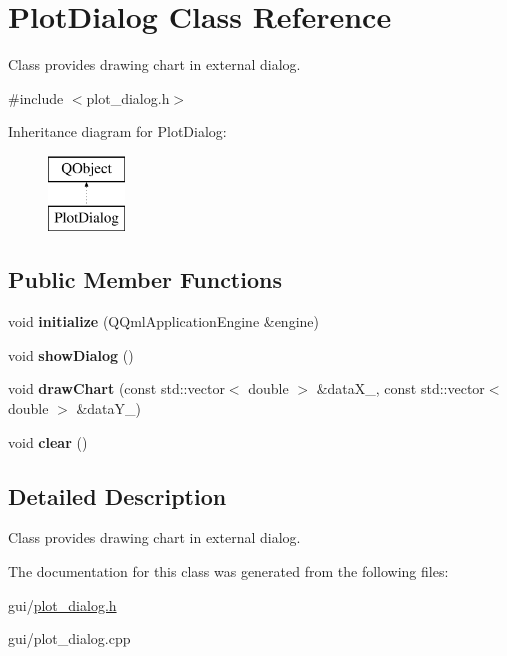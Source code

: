 \hypertarget{class_plot_dialog}{}\section{Plot\+Dialog Class Reference}
\label{class_plot_dialog}


Class provides drawing chart in external dialog.  




{\ttfamily \#include $<$plot\+\_\+dialog.\+h$>$}

Inheritance diagram for Plot\+Dialog\+:\begin{figure}[H]
\begin{center}
\leavevmode
\includegraphics[height=2.000000cm]{class_plot_dialog}
\end{center}
\end{figure}
\subsection*{Public Member Functions}
\begin{DoxyCompactItemize}
\item 
\mbox{\label{class_plot_dialog_ae5fb95c5336b5dd2267101dd181989a5}} 
void {\bfseries initialize} (Q\+Qml\+Application\+Engine \&engine)
\item 
\mbox{\label{class_plot_dialog_a7b5d5b476275028bf4186e737d50ebbe}} 
void {\bfseries show\+Dialog} ()
\item 
\mbox{\label{class_plot_dialog_a5bb43876e8c339604c4827d536a54726}} 
void {\bfseries draw\+Chart} (const std\+::vector$<$ double $>$ \&data\+X\+\_\+, const std\+::vector$<$ double $>$ \&data\+Y\+\_\+)
\item 
\mbox{\label{class_plot_dialog_aeffbb53cffcdb443a0395a147d2b684b}} 
void {\bfseries clear} ()
\end{DoxyCompactItemize}


\subsection{Detailed Description}
Class provides drawing chart in external dialog. 

The documentation for this class was generated from the following files\+:\begin{DoxyCompactItemize}
\item 
gui/\hyperlink{plot__dialog_8h}{plot\+\_\+dialog.\+h}\item 
gui/plot\+\_\+dialog.\+cpp\end{DoxyCompactItemize}
